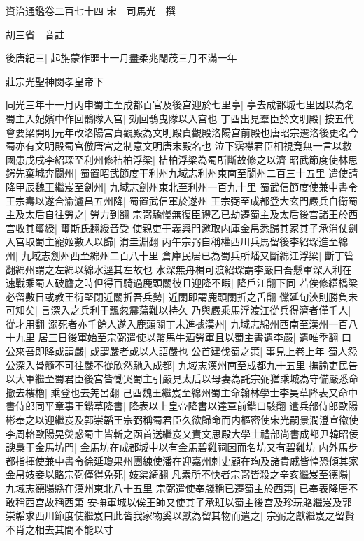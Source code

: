 資治通鑑卷二百七十四
宋　司馬光　撰

胡三省　音註

後唐紀三|{
	起旃蒙作噩十一月盡柔兆閹茂三月不滿一年}


莊宗光聖神閔孝皇帝下

同光三年十一月丙申蜀主至成都百官及後宫迎於七里亭|{
	亭去成都城七里因以為名}
蜀主入妃嬪中作回鶻隊入宫|{
	効回鶻曳隊以入宫也}
丁酉出見羣臣於文明殿|{
	按五代會要梁開明元年改洛陽宫貞觀殿為文明殿貞觀殿洛陽宫前殿也唐昭宗遷洛後更名今蜀亦有文明殿蜀宫倣唐宫之制意文明唐末殿名也}
泣下霑襟君臣相視竟無一言以救國患戊戌李紹琛至利州修桔柏浮梁|{
	桔柏浮梁為蜀所斷故修之以濟}
昭武節度使林思鍔先棄城奔閬州|{
	蜀置昭武節度干利州九域志利州東南至閬州二百三十五里}
遣使請降甲辰魏王繼岌至劍州|{
	九域志劍州東北至利州一百九十里}
蜀武信節度使兼中書令王宗壽以遂合渝瀘昌五州降|{
	蜀置武信軍於遂州}
王宗弼至成都登大玄門嚴兵自衛蜀主及太后自往勞之|{
	勞力到翻}
宗弼驕慢無復臣禮乙已劫遷蜀主及太后後宫諸王於西宫收其璽綬|{
	璽斯氏翻綬音受}
使親吏于義興門邀取内庫金帛悉歸其家其子承㳙仗劍入宫取蜀主寵姬數人以歸|{
	㳙圭淵翻}
丙午宗弼自稱權西川兵馬留後李紹琛進至綿州|{
	九域志劍州西至綿州二百八十里}
倉庫民居已為蜀兵所燔又斷綿江浮梁|{
	斷丁管翻綿州謂之左綿以綿水逕其左故也}
水深無舟楫可渡紹琛謂李嚴曰吾懸軍深入利在速戰乘蜀人破膽之時但得百騎過鹿頭關彼且迎降不暇|{
	降戶江翻下同}
若俟修繕橋梁必留數日或教王衍堅閉近關折吾兵勢|{
	近關即謂鹿頭關折之舌翻}
儻延旬浹則勝負未可知矣|{
	言深入之兵利于飄忽震蕩難以持久}
乃與嚴乘馬浮渡江從兵得濟者僅千人|{
	從才用翻}
溺死者亦千餘人遂入鹿頭關丁未進據漢州|{
	九域志綿州西南至漢州一百八十九里}
居三日後軍始至宗弼遣使以幣馬牛酒勞軍且以蜀主書遺李嚴|{
	遺唯季翻}
曰公來吾即降或謂嚴|{
	或謂嚴者或以人語嚴也}
公首建伐蜀之策|{
	事見上卷上年}
蜀人怨公深入骨髓不可往嚴不從欣然馳入成都|{
	九域志漢州南至成都九十五里}
撫諭吏民告以大軍繼至蜀君臣後宫皆慟哭蜀主引嚴見太后以母妻為託宗弼猶乘城為守備嚴悉命撤去樓櫓|{
	乘登也去羌呂翻}
己酉魏王繼岌至綿州蜀主命翰林學士李昊草降表又命中書侍郎同平章事王鍇草降書|{
	降表以上皇帝降書以達軍前鍇口駭翻}
遣兵部侍郎歐陽彬奉之以迎繼岌及郭崇韜王宗弼稱蜀君臣久欲歸命而内樞密使宋光嗣景潤澄宣徽使李周輅歐陽晃熒惑蜀主皆斬之函首送繼岌又責文思殿大學士禮部尚書成都尹韓昭佞諛梟于金馬坊門|{
	金馬坊在成都城中以有金馬碧雞祠因而名坊又有碧雞坊}
内外馬步都指揮使兼中書令徐延瓊果州團練使潘在迎嘉州刺史顧在珣及諸貴戚皆惶恐傾其家金帛妓妾以賂宗弼僅得免死|{
	妓渠綺翻}
凡素所不快者宗弼皆殺之辛亥繼岌至德陽|{
	九域志德陽縣在漢州東北八十五里}
宗弼遣使奉牋稱已遷蜀主於西第|{
	已奉表降唐不敢稱西宫故稱西第}
安撫軍城以俟王師又使其子承班以蜀主後宫及珍玩賂繼岌及郭崇韜求西川節度使繼岌曰此皆我家物奚以獻為留其物而遣之|{
	宗弼之獻繼岌之留賢不肖之相去其間不能以寸}
